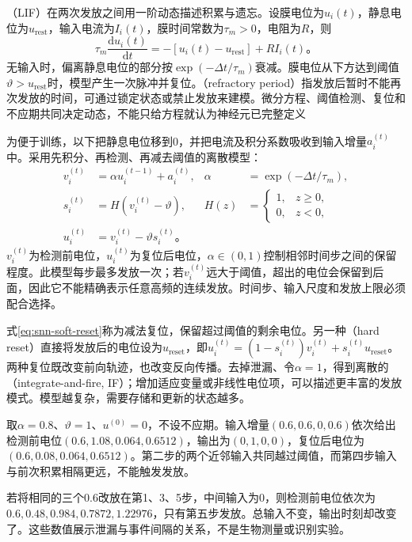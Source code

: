 （LIF）在两次发放之间用一阶动态描述积累与遗忘。设膜电位为$u_i(t)$，静息电位为$u_{\mathrm{rest}}$，输入电流为$I_i(t)$，膜时间常数为$\tau_m>0$，电阻为$R$，则
\begin{equation}
  \tau_m\frac{\mathrm d u_i(t)}{\mathrm d t}
  =-[u_i(t)-u_{\mathrm{rest}}]+RI_i(t)\text{。}
  \label{eq:snn-continuous-lif}
\end{equation}
无输入时，偏离静息电位的部分按$\exp(-\Delta t/\tau_m)$衰减。膜电位从下方达到阈值$\vartheta>u_{\mathrm{rest}}$时，模型产生一次脉冲并复位。（refractory period）指发放后暂时不能再次发放的时间，可通过锁定状态或禁止发放来建模。微分方程、阈值检测、复位和不应期共同决定动态，不能只给方程就认为神经元已完整定义

为便于训练，以下把静息电位移到0，并把电流及积分系数吸收到输入增量$a_i^{(t)}$中。采用先积分、再检测、再减去阈值的离散模型：
\begin{align}
  v_i^{(t)}&=\alpha u_i^{(t-1)}+a_i^{(t)},
  &\alpha&=\exp(-\Delta t/\tau_m),\label{eq:snn-discrete-integrate}\\
  s_i^{(t)}&=H(v_i^{(t)}-\vartheta),
  &H(z)&=\begin{cases}1,&z\geq0,\\0,&z<0,\end{cases}
  \label{eq:snn-discrete-fire}\\
  u_i^{(t)}&=v_i^{(t)}-\vartheta s_i^{(t)}\text{。}
  \label{eq:snn-soft-reset}
\end{align}
$v_i^{(t)}$为检测前电位，$u_i^{(t)}$为复位后电位，$\alpha\in(0,1)$控制相邻时间步之间的保留程度。此模型每步最多发放一次；若$v_i^{(t)}$远大于阈值，超出的电位会保留到后面，因此它不能精确表示任意高频的连续发放。时间步、输入尺度和发放上限必须配合选择。

式\eqref{eq:snn-soft-reset}称为减法复位，保留超过阈值的剩余电位。另一种（hard reset）直接将发放后的电位设为$u_{\mathrm{reset}}$，即$u_i^{(t)}=(1-s_i^{(t)})v_i^{(t)}+s_i^{(t)}u_{\mathrm{reset}}$。两种复位既改变前向轨迹，也改变反向传播。去掉泄漏、令$\alpha=1$，得到离散的（integrate-and-fire, IF）；增加适应变量或非线性电位项，可以描述更丰富的发放模式。模型越复杂，需要存储和更新的状态越多。

\begin{example}[相同输入在不同间隔下的结果]
  \label{ex:snn-integration}
  取$\alpha=0.8$、$\vartheta=1$、$u^{(0)}=0$，不设不应期。输入增量$(0.6,0.6,0,0.6)$依次给出检测前电位$(0.6,1.08,0.064,0.6512)$，输出为$(0,1,0,0)$，复位后电位为$(0.6,0.08,0.064,0.6512)$。第二步的两个近邻输入共同越过阈值，而第四步输入与前次积累相隔更远，不能触发发放。

  若将相同的三个$0.6$改放在第1、3、5步，中间输入为0，则检测前电位依次为$0.6,0.48,0.984,0.7872,1.22976$，只有第五步发放。总输入不变，输出时刻却改变了。这些数值展示泄漏与事件间隔的关系，不是生物测量或识别实验。
\end{example}

